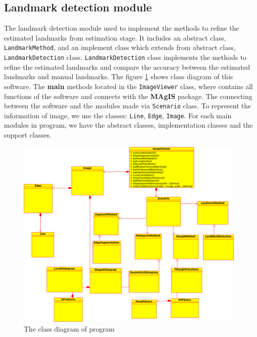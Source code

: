 \subsection{Landmark detection module}
The landmark detection module used to implement the methods to refine the estimated landmarks from estimation stage. It includes an abstract class, \texttt{LandmarkMethod}, and an implement class which extends from abstract class, \texttt{LandmarkDetection} class. \texttt{LandmarkDetection} class implements the methods to refine the estimated landmarks and compare the accuracy between the estimated landmarks and manual landmarks.
\iffalse
The figure \ref{fig:43} shows class diagram of this software. The \textbf{main} methods located in the \texttt{ImageViewer} class, where contains all functions of the software and connects with the \textbf{MAgIS} package. The connecting between the software and the modules made via \texttt{Scenario} class. To represent the information of image, we use the classes: \texttt{Line}, \texttt{Edge}, \texttt{Image}. For each main modules in program, we have the abstract classes, implementation classes and the support classes. \\
\begin{figure}[h!]
\centering
\includegraphics[width=1.1\textwidth]{./images/main}
\caption{The class diagram of program}
\label{fig:43}
\end{figure}
